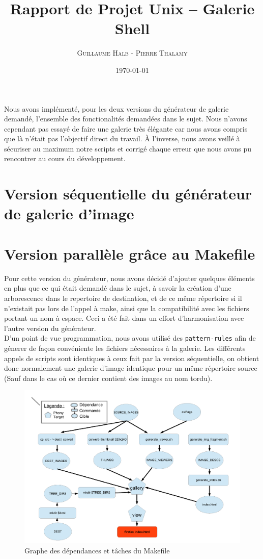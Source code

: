 \documentclass{article}
\title{Rapport de Projet Unix -- Galerie Shell}
\author{\textsc{Guillaume Halb} - \textsc{Pierre Thalamy}}
\date{\today}
\begin{document}
\maketitle

Nous avons implémenté, pour les deux versions du générateur
de galerie demandé, l'ensemble des fonctionalités demandées dans le
sujet. Nous n'avons cependant pas essayé de faire une galerie très élégante car
nous avons compris que là n'était pas l'objectif direct du travail. À
l'inverse, nous avons veillé à sécuriser au maximum notre scripts et
corrigé chaque erreur que nous avons pu rencontrer au cours du
développement.

\section{Version séquentielle du générateur de galerie d'image}

\section{Version parallèle grâce au Makefile}
Pour cette version du générateur, nous avons décidé d'ajouter quelques
éléments en plus que ce qui était demandé dans le sujet, à savoir la
création d'une arborescence dans le repertoire de destination, et de
ce même répertoire si il n'existait pas lors de l'appel à
make, ainsi que la compatibilité avec les fichiers portant un nom à
espace. Ceci a été fait dans un effort d'harmonisation avec l'autre
version du générateur. \\  

D'un point de vue programmation, nous avons utilisé des
\lstinline!pattern-rules! afin de génerer de façon convéniente les
fichiers nécessaires à la galerie. Les différents appels de scripts
sont identiques à ceux fait par la version séquentielle, on obtient
donc normalement une galerie d'image identique pour un même répertoire
source (Sauf dans le cas où ce dernier contient des images au nom
tordu). \\

\begin{figure}[!h]
\begin{center}
  \includegraphics[width=10 cm]{makefile_graph.pdf}
  \caption{Graphe des dépendances et tâches du Makefile}
\end{center}
\label{fig:makefile_graph}
\end{figure}
\end{document}
